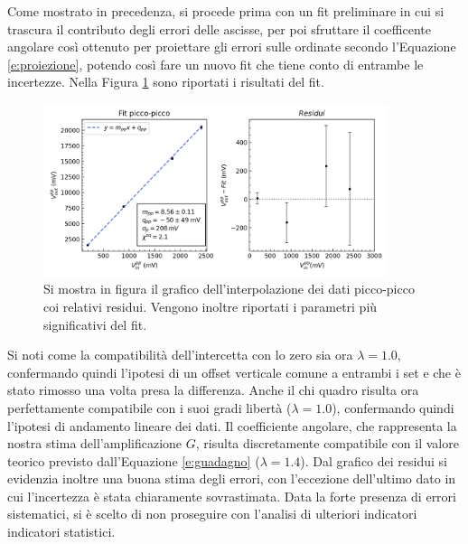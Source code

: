 \documentclass[a4paper,11pt]{article}
\begin{document}
\noindent Come mostrato in precedenza, si procede prima con un fit
preliminare in cui si trascura il contributo degli errori delle ascisse, per poi
sfruttare il coefficente angolare così ottenuto per proiettare gli errori sulle ordinate secondo l'Equazione \ref{e:proiezione}, potendo così fare un nuovo fit che tiene conto di
entrambe le incertezze. Nella Figura \ref{fig:lin_pp} sono riportati i risultati del fit.
\begin{figure}[h]
\centering
\includegraphics[width=0.9\textwidth]{images/grafico_pp}
\caption{\footnotesize Si mostra in figura il grafico dell'interpolazione dei dati picco-picco coi relativi
residui. Vengono inoltre riportati i parametri più significativi del fit.}\label{fig:lin_pp}
\end{figure}
Si noti come la compatibilità dell'intercetta con lo zero sia ora $\lambda=1.0$, confermando quindi l'ipotesi di un offset verticale comune a entrambi i set e che è stato rimosso una volta
presa la differenza. Anche il chi quadro risulta ora perfettamente compatibile con i suoi
gradi libertà ($\lambda=1.0$), confermando quindi l'ipotesi di andamento lineare dei
dati. Il coefficiente angolare, che rappresenta la nostra stima dell'amplificazione $G$,
risulta discretamente compatibile con il valore teorico previsto dall'Equazione
\ref{e:guadagno} ($\lambda = 1.4$).
Dal grafico dei residui si evidenzia inoltre una buona stima degli errori, con l'eccezione
dell'ultimo dato in cui l'incertezza è stata chiaramente sovrastimata.
Data la forte presenza di errori sistematici, si è scelto di non proseguire con l'analisi di
ulteriori indicatori indicatori statistici.
\end{document}
